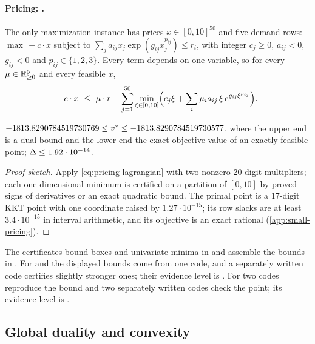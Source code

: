 \paragraph{Pricing: .}
The only maximization instance has prices $x\in[0,10]^{50}$ and five demand rows:
$\max\,-c\cdot x$ subject to $\sum_ja_{ij}x_j\exp(g_{ij}x_j^{p_{ij}})\le r_i$, with integer $c_j\ge0$, $a_{ij}<0$, $g_{ij}<0$ and $p_{ij}\in\{1,2,3\}$.
Every term depends on one variable, so for every $\mu\in\mathbb{R}^5_{\ge0}$ and every feasible $x$,
\begin{equation}\label{eq:pricing-lagrangian}
-c\cdot x\ \le\ \mu\cdot r-\sum_{j=1}^{50}\min_{\xi\in[0,10]}\Bigl(c_j\xi+\sum_i\mu_ia_{ij}\,\xi\, e^{g_{ij}\xi^{p_{ij}}}\Bigr).
\end{equation}

\begin{theorem}\label{thm:pricing-bound}
$-1813.8290784519730769\le v^{*}\le-1813.8290784519730577$, where the upper end is a dual bound and the lower end the exact objective value of an exactly feasible point; $\Delta\le1.92\cdot10^{-14}$.
\end{theorem}

\begin{proof}[Proof sketch]
Apply \eqref{eq:pricing-lagrangian} with two nonzero 20-digit multipliers; each one-dimensional minimum is certified on a partition of $[0,10]$ by proved signs of derivatives or an exact quadratic bound.
The primal point is a 17-digit KKT point with one coordinate raised by $1.27\cdot10^{-15}$; its row slacks are at least $3.4\cdot10^{-15}$ in interval arithmetic, and its objective is an exact rational (\cref{app:small-pricing}).
\end{proof}

The certificates bound boxes and univariate minima in  and assemble the bounds in .
For  and  the displayed bounds come from one code, and a separately written code certifies slightly stronger ones; their evidence level is .
For  two codes reproduce the bound and two separately written codes check the point; its evidence level is .

\subsection{Global duality and convexity}\label{sec:other-convex}

